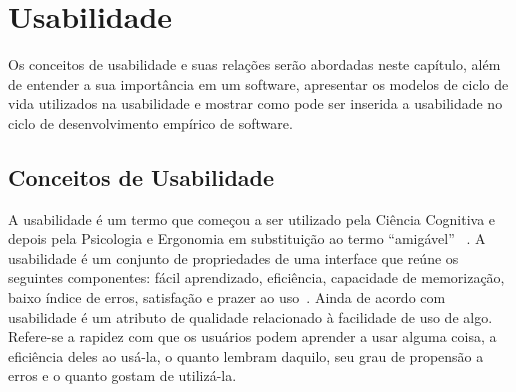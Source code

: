 \chapter{Usabilidade}

Os conceitos de usabilidade e suas relações serão abordadas neste capítulo, além de entender a sua importância em um software, apresentar os modelos de ciclo de vida utilizados na usabilidade e mostrar como pode ser inserida a usabilidade no ciclo de desenvolvimento empírico de software.

\section{Conceitos de Usabilidade}

A usabilidade é um termo que começou a ser utilizado pela Ciência Cognitiva e depois pela Psicologia e Ergonomia em substituição ao termo ``amigável'' ~\cite{dias2006}.
% 
A usabilidade é um conjunto de propriedades de uma interface que reúne os seguintes componentes: fácil aprendizado, eficiência, capacidade de memorização, baixo índice de erros, satisfação e prazer ao uso~\cite{nielsen1994}.
%
Ainda de acordo com  usabilidade é um atributo de qualidade relacionado à facilidade de uso de algo. Refere-se a rapidez com que os usuários podem aprender a usar alguma coisa, a eficiência deles ao usá-la, o quanto lembram daquilo, seu grau de propensão a erros e o quanto gostam de utilizá-la. 
%

